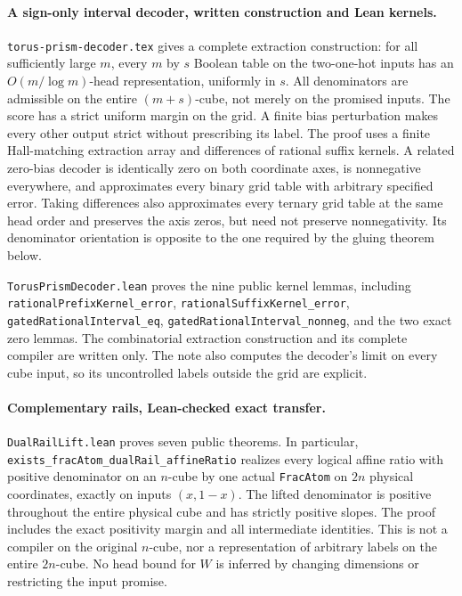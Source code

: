 \documentclass[11pt]{article}
\begin{document}
\paragraph{A sign-only interval decoder, written construction and Lean kernels.}
\texttt{torus-prism-decoder.tex} gives a complete extraction construction:
for all sufficiently large $m$, every $m$ by $s$ Boolean table on
the two-one-hot inputs has an $O(m/\log m)$-head representation,
uniformly in $s$. All denominators are admissible on the entire
$(m+s)$-cube, not merely on the promised inputs. The score has a
strict uniform margin on the grid. A finite bias perturbation makes
every other output strict without prescribing its label.
The proof uses a finite Hall-matching extraction array and differences
of rational suffix kernels. A related zero-bias decoder is identically
zero on both coordinate axes, is nonnegative everywhere, and
approximates every binary grid table with arbitrary specified error.
Taking differences also approximates every ternary grid table at the
same head order and preserves the axis zeros, but need not preserve
nonnegativity. Its denominator orientation
is opposite to the one required by the gluing theorem below.

\texttt{TorusPrismDecoder.lean} proves the nine public kernel lemmas,
including \texttt{rationalPrefixKernel\_error},
\texttt{rationalSuffixKernel\_error},
\texttt{gatedRationalInterval\_eq},
\texttt{gatedRationalInterval\_nonneg}, and the two exact zero lemmas.
The combinatorial extraction construction and its complete compiler
are written only. The note also computes the decoder's limit on every
cube input, so its uncontrolled labels outside the grid are explicit.

\paragraph{Complementary rails, Lean-checked exact transfer.}
\texttt{DualRailLift.lean} proves seven public theorems. In particular,
\texttt{exists\_fracAtom\_dualRail\_affineRatio} realizes every logical
affine ratio with positive denominator on an $n$-cube by one actual
\texttt{FracAtom} on $2n$ physical coordinates, exactly on inputs
$(x,1-x)$. The lifted denominator is positive throughout the entire
physical cube and has strictly positive slopes. The proof includes
the exact positivity margin and all intermediate identities.
This is not a compiler on the original $n$-cube, nor a representation
of arbitrary labels on the entire $2n$-cube. No head bound for $W$
is inferred by changing dimensions or restricting the input promise.
\end{document}
